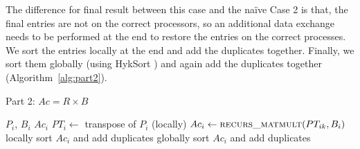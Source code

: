 The difference for final result between this case and the na\"{i}ve Case 2 is that, the final entries are not on the correct processors, so an additional data exchange needs to be performed at the end to restore the entries on the correct processes. We sort the entries locally at the end and add the duplicates together. Finally, we sort them globally (using HykSort \cite{Sundar:2013}) and again add the duplicates together (Algorithm~\ref{alg:part2}).

\begin{algorithm}[H] 
  \caption{Part 2: $Ac = R \times B$} \label{alg:part2} 
  \begin{algorithmic}[1]
    \Require $P_i$, $B_i$
    \Ensure  $Ac_i$
    \State $PT_i \leftarrow$ transpose of $P_i$ (locally)
      \State $Ac_i \leftarrow \textsc{recurs\_matmult}(PT_{ik}, B_i)$
    \EndFor
    \State locally sort $Ac_i$ and add duplicates
    \State globally sort $Ac_i$ and add duplicates
  \end{algorithmic}
\end{algorithm}
